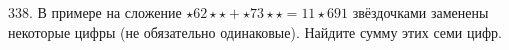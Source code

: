 338. В примере на сложение $\star62\star\star+\star73\star\star=11\star691$ звёздочками заменены некоторые цифры (не обязательно одинаковые). Найдите сумму этих семи цифр.\\
